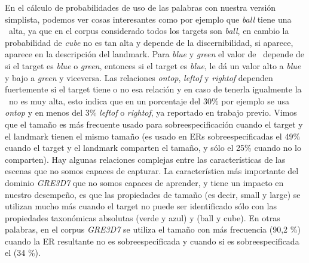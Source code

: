 En el c\'alculo de probabilidades de uso de las palabras con nuestra versi\'on simplista, podemos ver cosas interesantes como por ejemplo que {\it ball} tiene una \puse\ alta, ya que en el corpus considerado todos los targets son {\it ball}, en cambio la probabilidad de {\it cube} no es tan alta y depende de la discernibilidad, si aparece, aparece en la descripci\'on del landmark. Para {\it blue} y {\it green} el valor de \puse\ depende de si el target es {\it blue} o {\it green}, entonces si el target es {\it blue}, le d\'a un valor alto a {\it blue} y bajo a {\it green} y viceversa. Las relaciones {\it ontop}, {\it leftof} y {\it rightof} dependen fuertemente si el target tiene o no esa relaci\'on y en caso de tenerla igualmente la \puse\ no es muy alta, esto indica que en un porcentaje del 30\% por ejemplo se usa {\it ontop} y en menos del 3\% {\it leftof} o {\it rightof}, ya reportado en trabajo previo. Vimos que el tama\~no es m\'as frecuente usado para sobreespecificaci\'on cuando el target y el landmark tienen el mismo tama\~no (es usado en ERs sobreespecificadas el 49\% cuando el target y el landmark comparten el tama\~no, y s\'olo el 25\% cuando no lo comparten).
Hay algunas relaciones complejas entre las caracter\'{i}sticas de las escenas que no somos capaces de
capturar. La caracter\'{i}stica m\'as importante del dominio \textit{GRE3D7}
que no somos capaces de aprender, y tiene un impacto en nuestro desempe\~no, es que
las propiedades de tama\~no (es decir, small y large) se utilizan mucho
m\'as cuando el target no puede ser identificado s\'olo con las propiedades taxon\'omicas absolutas 
(verde y azul) y (ball y cube). En otras palabras, en el corpus \textit{GRE3D7} se utiliza el tama\~no con m\'as frecuencia (90,2 \%)
cuando la ER resultante no es sobreespecificada y cuando si es sobreespecificada el (34 \%). \\

